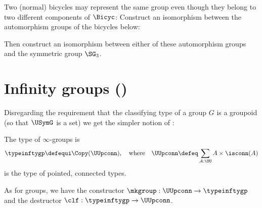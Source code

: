 \begin{xca}
  Two (normal) bicycles may represent the same group even though they belong to
  two different components of $\Bicyc$:
  Construct an isomorphism between the automorphism groups of the bicycles below:
  \begin{center}
    \hspace{1cm}
  \end{center}
  Then construct an isomorphism between either of these automorphism groups
  and the symmetric group $\SG_3$.
\end{xca}

\section{Infinity groups (\texorpdfstring{\inftygps}{∞-groups})}
\label{sec:inftygps}

Disregarding the requirement that the classifying type
of a group $G$ is a groupoid (so that $\USymG$ is a set)
we get the simpler notion of \inftygps:
\begin{definition}\label{def:inftygps}
  The type of $\infty$-groups is
  \[
    \typeinftygp\defequi \Copy(\UUpconn),
    \quad\text{where}\quad
    \UUpconn\defeq \sum_{A:\UU} A\times \isconn(A)
  \]
  is the type of pointed, connected types.

  As for groups, we have the constructor 
  $\mkgroup : \UUpconn \to \typeinftygp$
  and the destructor $\clf : \typeinftygp \to \UUpconn$.
\end{definition}

